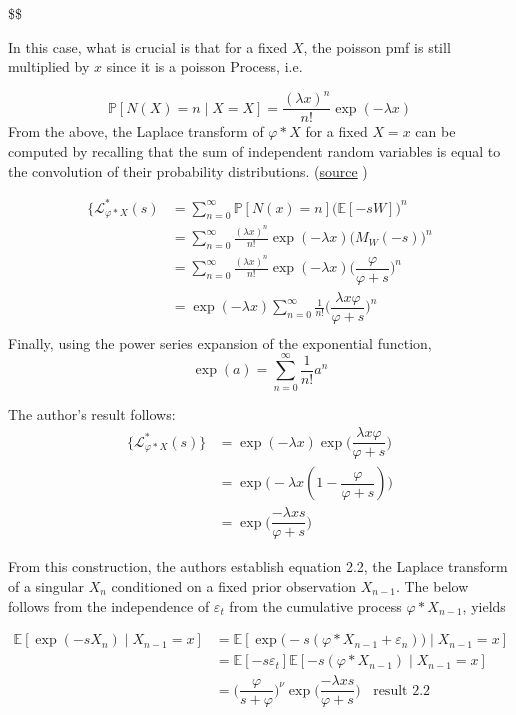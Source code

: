 \documentclass[
  letterpaper,
  DIV=11,
  numbers=noendperiod]{scrartcl}
\begin{document}
\$\$

In this case, what is crucial is that for a fixed \(X\), the poisson pmf
is still multiplied by \(x\) since it is a poisson Process, i.e.

\[
\mathbb{P}[N(X) = n \mid X =X] = \frac{(\lambda x)^n}{n!}\exp(- \lambda x)
\] From the above, the Laplace transform of \(\varphi \ast X\) for a
fixed \(X = x\) can be computed by recalling that the sum of independent
random variables is equal to the convolution of their probability
distributions.
(\href{https://en.wikipedia.org/wiki/Laplace\%E2\%80\%93Stieltjes_transform}{source}
)

\[
\begin{aligned}
\{\mathcal{L}^{*}_{\varphi \ast X}(s) &= \sum_{n = 0}^{\infty} \mathbb{P}[N(x) = n]\big(\mathbb{E}[-sW]\big)^n \\
&= \sum_{n = 0}^{\infty}  \frac{(\lambda x)^n}{n!}\exp(- \lambda x)\big(M_W(-s))^n \\
&= \sum_{n = 0}^{\infty}  \frac{(\lambda x)^n}{n!}\exp(- \lambda x) \Big( \dfrac{\varphi}{\varphi + s} \Big)^n \\
&= \exp(- \lambda x)\sum_{n = 0}^{\infty}  \frac{1}{n!} \Big( \dfrac{\lambda x\varphi}{\varphi + s} \Big)^n \\
\end{aligned}
\] Finally, using the power series expansion of the exponential
function, \[
\exp(a) = \sum_{n = 0}^{\infty} \frac{1}{n!}a^n
\]

The author's result follows: \[
\begin{aligned}
\{\mathcal{L}^{*}_{\varphi \ast X}(s) \}&= \exp(-\lambda x)\exp\Big( \dfrac{\lambda x\varphi}{\varphi + s} \Big) \\
&= \exp\big(-\lambda x  (1-\dfrac{\varphi}{\varphi + s} ) \big) \\
&= \boxed{\exp\Big( \dfrac{-\lambda x s}{\varphi + s} \Big)}
\end{aligned}
\]

From this construction, the authors establish equation 2.2, the Laplace
transform of a singular \(X_n\) conditioned on a fixed prior observation
\(X_{n-1}\). The below follows from the independence of
\(\varepsilon_t\) from the cumulative process \(\varphi \ast X_{n-1}\),
yields

\[
\begin{aligned}
\mathbb{E}[\exp(-sX_n) \mid X_{n-1} = x] &= \mathbb{E}[\exp\big(-s( \varphi \ast X_{n-1} + \varepsilon_n) \big) \mid X_{n-1} = x] \\
&= \mathbb{E}[-s\varepsilon_t]\mathbb{E}[-s(\varphi \ast X_{n-1})\mid X_{n-1} = x] \\
&= \boxed{ \Big(\dfrac{\varphi}{s + \varphi}\Big)^\nu\exp\Big( \dfrac{-\lambda x s}{\varphi + s} \Big)} \;\; \text{ result 2.2}
\end{aligned}
\]
\end{document}
